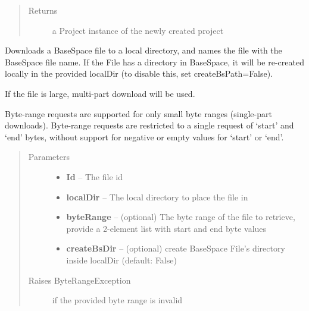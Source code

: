 \documentclass[letterpaper,10pt,english]{sphinxmanual}
\begin{document}
\begin{fulllineitems}
\begin{fulllineitems}
\begin{quote}
\begin{description}
\item[{Returns}] \leavevmode
a Project instance of the newly created project

\end{description}\end{quote}

\end{fulllineitems}


\begin{fulllineitems}
\label{Available modules:BaseSpacePy.api.BaseSpaceAPI.BaseSpaceAPI.fileDownload}
Downloads a BaseSpace file to a local directory, and names the file with the BaseSpace file name.
If the File has a directory in BaseSpace, it will be re-created locally in the provided localDir 
(to disable this, set createBsPath=False).

If the file is large, multi-part download will be used.

Byte-range requests are supported for only small byte ranges (single-part downloads).
Byte-range requests are restricted to a single request of `start' and `end' bytes, without support for
negative or empty values for `start' or `end'.
\begin{quote}\begin{description}
\item[{Parameters}] \leavevmode\begin{itemize}
\item {} 
\textbf{Id} -- The file id

\item {} 
\textbf{localDir} -- The local directory to place the file in

\item {} 
\textbf{byteRange} -- (optional) The byte range of the file to retrieve, provide a 2-element list with start and end byte values

\item {} 
\textbf{createBsDir} -- (optional) create BaseSpace File's directory inside localDir (default: False)

\end{itemize}

\item[{Raises ByteRangeException}] \leavevmode
if the provided byte range is invalid


\end{description}
\end{quote}
\end{fulllineitems}
\end{fulllineitems}
\end{document}
